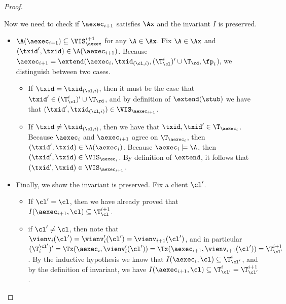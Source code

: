 \begin{proof}
\begin{itemize}
Now we need to check if \( \aexec_{i+1} \) satisfies \( \Ax\) and the invariant \( I \) is preserved.
\begin{itemize}
\item $\A(\aexec_{i+1}) \subseteq \VIS_{\aexec}^{i+1}$ for any $\A \in \Ax$.
Fix $\A \in \Ax$ and $(\txid', \txid) \in \A(\aexec_{i+1})$. 
Because $\aexec_{i+1} = \extend(\aexec_{i}, \txid_{(\cl, i)}, (\T_{\cl}^{i})' \cup \T_\rd, \fp_{i}$), 
we distinguish between two cases.
\begin{itemize}
\item If $\txid = \txid_{(\cl, i)}$, then it must be the case that $\txid' \in (\T^{i}_{\cl})' \cup \T_\rd$, 
and by definition of $\extend(\stub)$ we have that $(\txid' ,\txid_{(\cl, i)}) \in \VIS_{\aexec_{i+1}}$. 
\item If $\txid \neq \txid_{(\cl, i)}$, then we have that $\txid, \txid' \in \T_{\aexec_{i}}$. 
Because $\aexec_{i}$ and $\aexec_{i+1}$ agree on $\T_{\aexec_{i}}$, then $(\txid', \txid) \in \A(\aexec_{i})$.
Because $\aexec_{i} \models \A$, then $(\txid', \txid) \in \VIS_{\aexec_{i}}$. 
By definition of $\extend$, it follows that $(\txid', \txid) \in \VIS_{\aexec_{i+1}}$.
\end{itemize}

\item Finally, we show the invariant is preserved.
Fix a client $\cl'$. 
\begin{itemize}
\item If $\cl' = \cl$, then we have already proved that 
$I(\aexec_{i+1}, \cl) \subseteq \T_{\cl}^{i+1}$. 
\item if $\cl' \neq \cl$, then note that $\vienv_{i}(\cl') = \vienv'_{i}(\cl') = \vienv_{i+1}(\cl')$, 
and in particular $(\T^{\cl'}_{i})' = \Tx(\aexec_{i}, \vienv'_{i}(\cl')) = \Tx(\aexec_{i+1}, \vienv_{i+1}(\cl')) =  \T_{\cl'}^{i+1}$.
By the inductive hypothesis we know that $I(\aexec_{i}, \cl) \subseteq \T_{\cl'}^{i}$, 
and by the definition of invariant, we have $I(\aexec_{i+1}, \cl) \subseteq \T_{\cl'}^{i} = \T_{\cl'}^{i+1}$. 
\end{itemize}
\end{itemize}
\end{itemize}
\end{proof}

